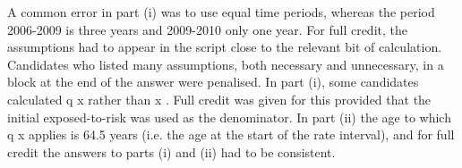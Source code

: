 \documentclass[a4paper,12pt]{article}
\begin{document}
\newpage
A common error in part (i) was to use equal time periods, whereas the period 2006-2009 is three years and 2009-2010 only one year. For full credit, the assumptions had to appear in
the script close to the relevant bit of calculation. Candidates who listed many assumptions, both necessary and unnecessary, in a block at the end of the answer were penalised. In part
(i), some candidates calculated q x rather than \mu x . Full credit was given for this provided that the initial exposed-to-risk was used as the denominator. In part (ii) the age to which q x
applies is 64.5 years (i.e. the age at the start of the rate interval), and for full credit the answers to parts (i) and (ii) had to be consistent.
\end{document}
